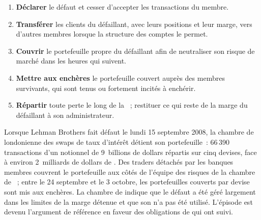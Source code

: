 \begin{method}\label{met:m1:clearing-and-settlement:dm}
\begin{enumerate}
\item \textbf{Déclarer} le défaut et cesser d'accepter les transactions du membre.
\item \textbf{Transférer} les clients du défaillant, avec leurs positions et
  leur marge, vers d'autres membres lorsque la structure des comptes le permet.
\item \textbf{Couvrir} le portefeuille propre du défaillant afin de neutraliser son
  risque de marché dans les heures qui suivent.
\item \textbf{Mettre aux enchères} le portefeuille couvert auprès des membres survivants, qui
  sont tenus ou fortement incités à enchérir.
\item \textbf{Répartir} toute perte le long de la ~; restituer ce qui
  reste de la marge du défaillant à son administrateur.
\end{enumerate}
\end{method}

\begin{example}[Septembre 2008]\label{ex:m1:clearing-and-settlement:lehman}
Lorsque Lehman Brothers fait défaut le lundi 15 septembre 2008, la chambre de  londonienne
des swaps de taux d'intérêt détient son portefeuille~: 66\,390 transactions
d'un notionnel de 9~billions de dollars répartis sur cinq devises, face à environ
2~milliards de dollars de . Des traders détachés par les banques membres couvrent le
portefeuille aux côtés de l'équipe des risques de la chambre de ~; entre le 24 septembre et
le 3 octobre, les portefeuilles couverts par devise sont mis aux enchères. La chambre de 
indique que le défaut a été géré largement dans les limites de la marge détenue et que
son  n'a pas été utilisé. L'épisode est devenu l'argument de référence
en faveur des obligations de  qui ont suivi.
\end{example}

